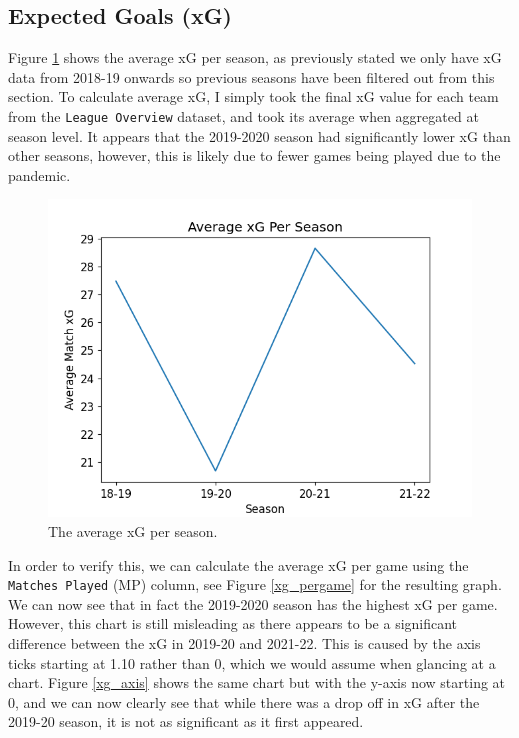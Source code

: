 \documentclass[12pt, a4paper, twocolumn]{article}
\begin{document}
\subsection{Expected Goals (xG)}

Figure \ref{xg} shows the average xG per season, as previously stated we only have xG data from 2018-19 onwards so previous seasons have been filtered out from this section. To calculate average xG, I simply took the final xG value for each team from the \verb|League Overview| dataset, and took its average when aggregated at season level. It appears that the 2019-2020 season had significantly lower xG than other seasons, however, this is likely due to fewer games being played due to the pandemic.

\begin{figure}
  \includegraphics[width=\linewidth]{../vis/tables/average_xg.png}
  \caption{The average xG per season.}
  \label{xg}
\end{figure}

In order to verify this, we can calculate the average xG per game using the \verb|Matches Played| (MP) column, see Figure \ref{xg_pergame} for the resulting graph. We can now see that in fact the 2019-2020 season has the highest xG per game. However, this chart is still misleading as there appears to be a significant difference between the xG in 2019-20 and 2021-22. This is caused by the axis ticks starting at 1.10 rather than 0, which we would assume when glancing at a chart. Figure \ref{xg_axis} shows the same chart but with the y-axis now starting at 0, and we can now clearly see that while there was a drop off in xG after the 2019-20 season, it is not as significant as it first appeared.
\end{document}
